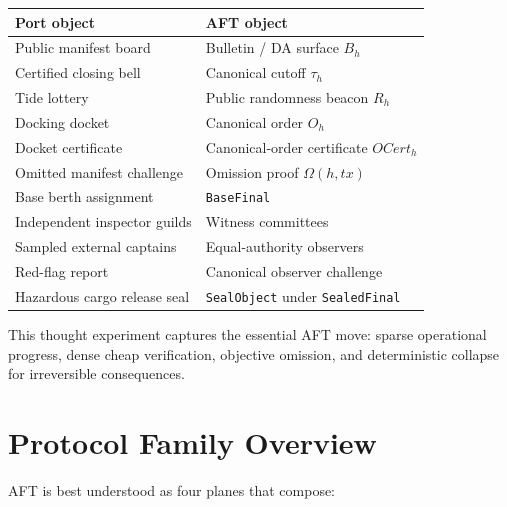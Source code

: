 \documentclass[11pt]{article}
\newcommand{\AFT}{\textsc{AFT}}
\newcommand{\code}[1]{\texttt{#1}}
\begin{document}
\begin{center}
\small
\begin{tabularx}{\textwidth}{>{\raggedright\arraybackslash}p{} X}
\toprule
\textbf{Port object} & \textbf{\AFT{} object} \\
\midrule
Public manifest board & Bulletin / DA surface \(B_h\) \\
Certified closing bell & Canonical cutoff \(\tau_h\) \\
Tide lottery & Public randomness beacon \(R_h\) \\
Docking docket & Canonical order \(O_h\) \\
Docket certificate & Canonical-order certificate \(OCert_h\) \\
Omitted manifest challenge & Omission proof \(\Omega(h, tx)\) \\
Base berth assignment & \code{BaseFinal} \\
Independent inspector guilds & Witness committees \\
Sampled external captains & Equal-authority observers \\
Red-flag report & Canonical observer challenge \\
Hazardous cargo release seal & \code{SealObject} under \code{SealedFinal} \\
\bottomrule
\end{tabularx}
\end{center}

This thought experiment captures the essential \AFT{} move: sparse operational
progress, dense cheap verification, objective omission, and deterministic
collapse for irreversible consequences.

\section{Protocol Family Overview}

\AFT{} is best understood as four planes that compose:
\end{document}
